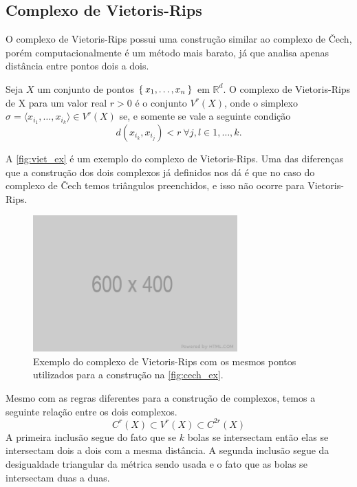 \subsection{Complexo de Vietoris-Rips}
O complexo de Vietoris-Rips possui uma construção similar ao complexo de \v{C}ech,
porém computacionalmente é um método mais barato, já que analisa apenas distância
entre pontos dois a dois.
\begin{defi}
  Seja $X$ um conjunto de pontos $\Set{x_1, \dots, x_n}$ em $\mathbb{R}^d$. O complexo
  de Vietoris-Rips de X para um valor real $r>0$ é o conjunto $V^r(X)$, onde o simplexo
  $\sigma = \langle x_{i_1}, \dots, x_{i_k} \rangle \in V^r(X)$ se, e somente se vale a seguinte
  condição
  \begin{equation*}
    d(x_{i_k}, x_{i_j}) < r \ \forall j,l \in{1,\dots,k}.
  \end{equation*}
\end{defi}
A \autoref{fig:viet_ex} é um exemplo do complexo de Vietoris-Rips. Uma das diferenças
que a construção dos dois complexos já definidos nos dá é que no caso do complexo
de \v{C}ech temos triângulos preenchidos, e isso não ocorre para Vietoris-Rips.
\begin{figure}[htb]
  \centering
  \includegraphics[width=0.7\textwidth]{images/placeholder.png}
  \caption{Exemplo do complexo de Vietoris-Rips com os mesmos pontos utilizados
  para a construção na \autoref{fig:cech_ex}.}
  \label{fig:viet_ex}
\end{figure}

Mesmo com as regras diferentes para a construção de complexos, temos a seguinte
relação entre os dois complexos.
\begin{equation}
  \label{eq:viet_cech}
  C^r(X) \subset V^r(X) \subset C^{2r}(X)
\end{equation}
A primeira inclusão segue do fato que se $k$ bolas se intersectam então elas se
intersectam dois a dois com a mesma distância. A segunda inclusão segue da
desigualdade triangular da métrica sendo usada e o fato que as bolas se
intersectam duas a duas.

